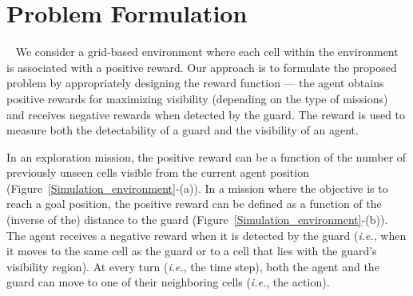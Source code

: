 \documentclass[10 pt, conference]{ieeeconf}
\newcommand{\pcomment}{\textcolor{red}}%
\newcommand{\ie}{\emph{i.e.}}
\begin{document}
%
\section{Problem Formulation}~\label{sec:probform}
We consider a grid-based environment where each cell within the environment is associated with a positive reward. Our approach is to formulate the proposed problem by appropriately designing the reward function --- the agent obtains positive rewards for maximizing visibility (depending on the type of missions) and receives negative rewards when detected by the guard. The reward is used to measure both the detectability of a guard and the visibility of an agent.

In an exploration mission, the positive reward can be a function of the number of previously unseen cells visible from the current agent position (Figure~\ref{Simulation_environment}-(a)). In a mission where the objective is to reach a goal position, the positive reward can be defined as a function of the (inverse of the) distance to the guard (Figure~\ref{Simulation_environment}-(b)). The agent receives a negative reward when it is detected by the guard (\ie, when it moves to the same cell as the guard or to a cell that lies with the guard's visibility region). At every turn (\ie, the time step), both the agent and the guard can move to one of their neighboring cells (\ie, the action).

\end{document}
